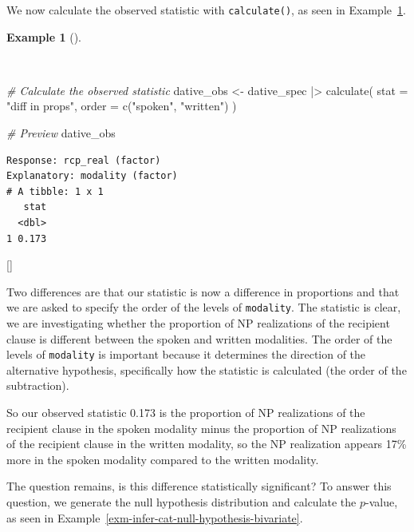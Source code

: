 \documentclass[
  letterpaper,
  krantz1]{latex/krantz-mod}
\newenvironment{Shaded}{\begin{snugshade}}{\end{snugshade}}
\newcommand{\AttributeTok}[1]{\textcolor[rgb]{0.00,0.00,0.00}{#1}}
\newcommand{\CommentTok}[1]{\textcolor[rgb]{0.00,0.00,0.00}{\textit{#1}}}
\newcommand{\FunctionTok}[1]{\textcolor[rgb]{0.00,0.00,0.00}{#1}}
\newcommand{\NormalTok}[1]{\textcolor[rgb]{0.00,0.00,0.00}{#1}}
\newcommand{\OtherTok}[1]{\textcolor[rgb]{0.00,0.00,0.00}{#1}}
\newcommand{\SpecialCharTok}[1]{\textcolor[rgb]{0.00,0.00,0.00}{#1}}
\newcommand{\StringTok}[1]{\textcolor[rgb]{0.00,0.00,0.00}{#1}}
\newcommand{\cindex}[1]{%
  \StrSubstitute{#1}{_}{\_}[\temp]%
  \index{\temp}%
}
\theoremstyle{definition}
\theoremstyle{definition}
\newtheorem{example}{Example}[chapter]
\theoremstyle{remark}
\begin{document}
We now calculate the observed statistic with \texttt{calculate()}, as
seen in Example~\ref{exm-infer-cat-calculate-bivariate}.

\begin{example}[]\protect\hypertarget{exm-infer-cat-calculate-bivariate}{}\label{exm-infer-cat-calculate-bivariate}

~

\begin{Shaded}
\begin{Highlighting}[numbers=left,,]
\CommentTok{\# Calculate the observed statistic}
\NormalTok{dative\_obs }\OtherTok{\textless{}{-}}
\NormalTok{  dative\_spec }\SpecialCharTok{|\textgreater{}}
  \FunctionTok{calculate}\NormalTok{(}
    \AttributeTok{stat =} \StringTok{"diff in props"}\NormalTok{,}
    \AttributeTok{order =} \FunctionTok{c}\NormalTok{(}\StringTok{"spoken"}\NormalTok{, }\StringTok{"written"}\NormalTok{)}
\NormalTok{  )}

\CommentTok{\# Preview}
\NormalTok{dative\_obs}
\end{Highlighting}
\end{Shaded}

\begin{verbatim}
Response: rcp_real (factor)
Explanatory: modality (factor)
# A tibble: 1 x 1
   stat
  <dbl>
1 0.173
\end{verbatim}

 \cindex{calculate()}

\end{example}

Two differences are that our statistic is now a difference in
proportions and that we are asked to specify the order of the levels of
\texttt{modality}. The statistic is clear, we are investigating whether
the proportion of NP realizations of the recipient clause is different
between the spoken and written modalities. The order of the levels of
\texttt{modality} is important because it determines the direction of
the alternative hypothesis, specifically how the statistic is calculated
(the order of the subtraction).

So our observed statistic 0.173 is the proportion of NP realizations of
the recipient clause in the spoken modality minus the proportion of NP
realizations of the recipient clause in the written modality, so the NP
realization appears 17\% more in the spoken modality compared to the
written modality.

The question remains, is this difference statistically significant? To
answer this question, we generate the null hypothesis
distribution and calculate the
\(p\)-value, as seen in
Example~\ref{exm-infer-cat-null-hypothesis-bivariate}.
\end{document}
